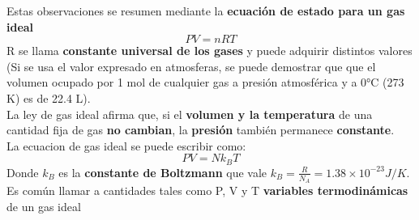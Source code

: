 \documentclass[10pt]{article}
\begin{document}
Estas observaciones se resumen mediante la \textbf{ecuación de estado para un gas ideal}
\begin{equation*}
	PV = nRT
\end{equation*}
R se llama \textbf{constante universal de los gases} y puede adquirir distintos valores (Si se usa el valor expresado en atmosferas, se puede demostrar que que el volumen ocupado por 1 mol de cualquier gas a presión atmosférica y a 0°C (273 K) es de 22.4 L).\\
\linebreak
La ley de gas ideal afirma que, si el \textbf{volumen y la temperatura} de una cantidad fija de gas \textbf{no cambian}, la \textbf{presión} también permanece \textbf{constante}.\\
\linebreak
La ecuacion de gas ideal se puede escribir como:
\begin{equation*}
	PV = Nk_B T
\end{equation*}
Donde $k_B$ es la \textbf{constante de Boltzmann} que vale $k_B = \frac{R}{N_A} = 1.38 \times 10^{-23} J/K$.\\
\linebreak
Es común llamar a cantidades tales como P, V y T \textbf{variables termodinámicas} de un gas ideal
\end{document}
